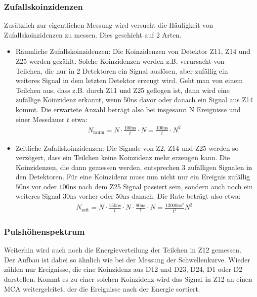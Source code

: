 \subsubsection{Zufallskoinzidenzen}
Zusätzlich zur eigentlichen Messung wird versucht die Häufigkeit von Zufallskoinzidenzen zu messen. Dies geschieht auf 2 Arten.
\begin{itemize}
	\item Räumliche Zufallskoinzidenzen: Die Koinzidenzen von Detektor Z11, Z14 und Z25 werden gezählt. Solche Koinzidenzen werden z.B. verursacht von Teilchen, die nur in 2 Detektoren ein Signal auslösen, aber zufällig ein weiteres Signal in dem letzten Detektor erzeugt wird. Geht man von einem Teilchen aus, dass z.B. durch Z11 und Z25 geflogen ist, dann wird eine zufällige Koinzidenz erkannt, wenn 50ns davor oder danach ein Signal aus Z14 kommt. Die erwartete Anzahl beträgt also bei insgesamt N Ereignisse und einer Messdauer $t$ etwa: 
\begin{align}
N_{\text{raum}} = N \cdot \frac{100\si{\nano\second}}{t} \cdot N = \frac{100\si{\nano\second}}{t} \cdot N^2 
\label{equ:random_space}
\end{align}

	\item Zeitliche Zufallskoinzidenzen: Die Signale von Z2, Z14 und Z25 werden so verzögert, dass ein Teilchen keine Koinzidenz mehr erzeugen kann. Die Koinzidenzen, die dann gemessen werden, entsprechen 3 zufälligen Signalen in den Detektoren. Für eine Koinzidenz muss nun nicht nur ein Ereignis zufällig $50\si{\nano \second}$ vor oder $100 \si{\nano \second}$ nach dem Z25 Signal passiert sein, sondern auch noch ein weiteres Signal $30\si{\nano \second}$ vorher oder $50\si{\nano \second}$ danach. Die Rate beträgt also etwa:
	\begin{align}
N_{\text{zeit}} = N \cdot \frac{150\si{\nano\second}}{t} \cdot N \cdot \frac{80\si{\nano\second}}{t} \cdot N = \frac{12000 \si{\nano\second}^2}{t^2}N^3
\label{equ:random_time}
\end{align}

\end{itemize}

\subsubsection{Pulshöhenspektrum}
Weiterhin wird auch noch die Energieverteilung der Teilchen in Z12 gemessen. Der Aufbau ist dabei so ähnlich wie bei der Messung der Schwellenkurve. Wieder zählen nur Ereignisse, die eine Koinzidenz aus D12 und D23, D24, D1 oder D2 darstellen. Kommt es zu einer solchen Koinzidenz wird das Signal in Z12 an einen MCA weitergeleitet, der die Ereignisse nach der Energie sortiert.
